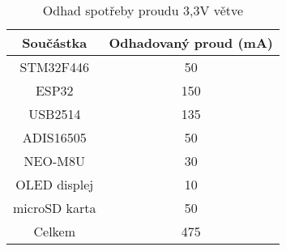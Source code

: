 \begin{table}[h!]
\centering

\begin{tabular}{|c|c|}
\hline 
Součástka & Odhadovaný proud (mA) \\ 
\hline 
\hline 
STM32F446 & 50 \\ 
\hline 
ESP32 & 150 \\ 
\hline 
USB2514 & 135 \\ 
\hline 
ADIS16505 & 50 \\ 
\hline 
NEO-M8U & 30 \\ 
\hline 
OLED displej & 10 \\ 
\hline 
microSD karta & 50 \\ 
\hline 
\hline 
Celkem & 475 \\ 
\hline 
\end{tabular} 

\caption{Odhad spotřeby proudu 3,3V větve} 
\label{table:currentConsumption}
\end{table} 
